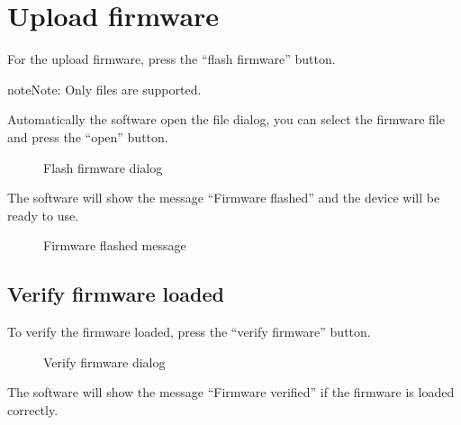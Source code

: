 \documentclass[letterpaper,10pt,english]{sphinxmanual}
\begin{document}
\sphinxstepscope


\chapter{Upload firmware}
\label{\detokenize{flash:upload-firmware}}\label{\detokenize{flash::doc}}
\sphinxAtStartPar
For the upload firmware, press the “flash firmware” button.

\begin{sphinxadmonition}{note}{Note:}
\sphinxAtStartPar
Only  files are supported.
\end{sphinxadmonition}

\sphinxAtStartPar
Automatically the software open the file dialog, you can select the firmware file and press the “open” button.

\begin{figure}[htbp]
\centering
\capstart

\noindent{}
\caption{Flash firmware dialog}\label{\detokenize{flash:id1}}\label{\detokenize{flash:figure-flash-firmware}}\end{figure}

\sphinxAtStartPar
The software will show the message “Firmware flashed” and the device will be ready to use.

\begin{figure}[htbp]
\centering
\capstart

\noindent{}
\caption{Firmware flashed message}\label{\detokenize{flash:id2}}\label{\detokenize{flash:figure-success}}\end{figure}


\section{Verify firmware loaded}
\label{\detokenize{flash:verify-firmware-loaded}}
\sphinxAtStartPar
To verify the firmware loaded, press the “verify firmware” button.

\begin{figure}[htbp]
\centering
\capstart

\noindent{}
\caption{Verify firmware dialog}\label{\detokenize{flash:id3}}\label{\detokenize{flash:figure-verify}}\end{figure}

\sphinxAtStartPar
The software will show the message “Firmware verified” if the firmware is loaded correctly.
\end{document}
